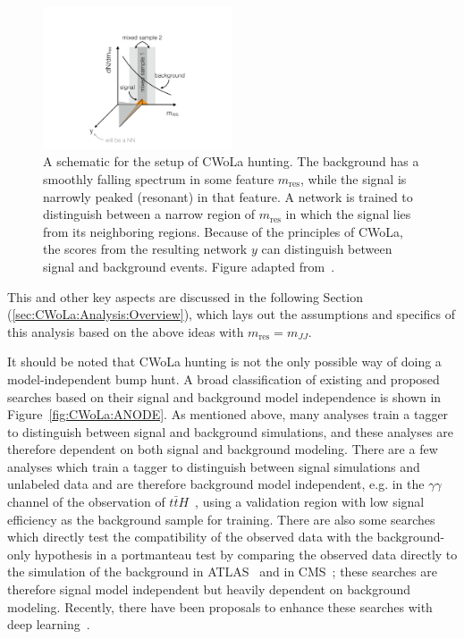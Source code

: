 \begin{figure}
\centering
\includegraphics[width=0.5\textwidth]{figures_CWoLa/cwolahuntingsetup.pdf}
\caption{
  A schematic for the setup of CWoLa hunting.
  The background has a smoothly falling spectrum in some feature $m_\text{res}$, while the signal is narrowly peaked (resonant) in that feature.
  A network is trained to distinguish between a narrow region of $m_\text{res}$ in which the signal lies from its neighboring regions.
  Because of the principles of CWoLa, the scores from the resulting network $y$ can distinguish between signal and background events. 
  Figure adapted from~\cite{NPKI_CWoLa_Hunting}.
}
\label{fig:CWoLa:cwolahuntingsetup}
\end{figure}

This and other key aspects are discussed in the following Section (\ref{sec:CWoLa:Analysis:Overview}), which lays out the assumptions and specifics of this analysis based on the above ideas with $m_\text{res}=m_{JJ}$.

It should be noted that CWoLa hunting is not the only possible way of doing a model-independent bump hunt.
A broad classification of existing and proposed searches based on their signal and background model independence is shown in Figure~\ref{fig:CWoLa:ANODE}.
As mentioned above, many analyses train a tagger to distinguish between signal and background simulations, and these analyses are therefore dependent on both signal and background modeling.
There are a few analyses which train a tagger to distinguish between signal simulations and unlabeled data and are therefore background model independent, e.g. in the $\gamma\gamma$ channel of the observation of $t\bar{t}H$~\cite{Aaboud:2018urx}, using a validation region with low signal efficiency as the background sample for training.
There are also some searches which directly test the compatibility of the observed data with the background-only hypothesis in a portmanteau test by comparing the observed data directly to the simulation of the background in ATLAS~\cite{ATLAS-CONF-2012-107,ATLAS-CONF-2014-006,Aaboud:2018ufy} and in CMS~\cite{CMS:2011fra,CMS:2017yoc}; these searches are therefore signal model independent but heavily dependent on background modeling.
Recently, there have been proposals to enhance these searches with deep learning~\cite{DAgnolo:2018cun,DAgnolo:2019vbw}.

